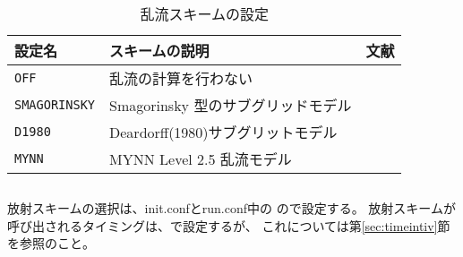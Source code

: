 \\

\begin{table}[h]
\begin{center}
  \caption{乱流スキームの設定}
  \label{tab:nml_atm_tb}
  \begin{tabularx}{150mm}{lXX} \hline
    \rowcolor[gray]{0.9}  設定名 & スキームの説明 & 文献\\ \hline
      \verb|OFF|          & 乱流の計算を行わない &  \\
      \verb|SMAGORINSKY|  & Smagorinsky 型のサブグリッドモデル    & \citet{smagorinsky_1963,lilly_1962,Brown_etal_1994,Scotti_1993} \\
      \verb|D1980|        & Deardorff(1980)サブグリットモデル &\citet{Deardorff_1980} \\
      \verb|MYNN|         & MYNN Level 2.5 乱流モデル & \citet{my_1982,nakanishi_2004} \\
    \hline
  \end{tabularx}
\end{center}
\end{table}




\subsection{\SubsecRadiationSetting} \label{subsec:basic_usel_radiation}
放射スキームの選択は、init.confとrun.conf中の
ので設定する。
放射スキームが呼び出されるタイミングは、で設定するが、
これについては第\ref{sec:timeintiv}節を参照のこと。\\

\\


